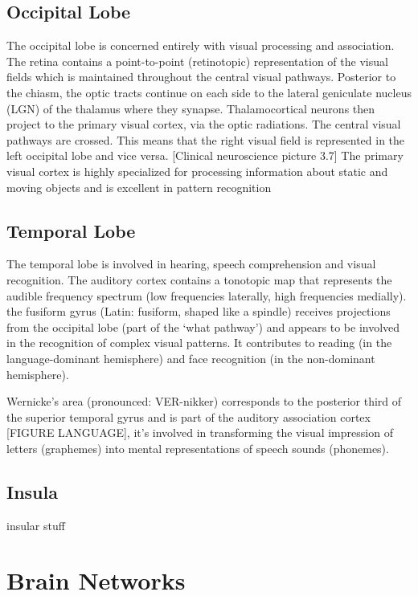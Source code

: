 \subsection{Occipital Lobe}
The occipital lobe is concerned entirely with visual processing and association.
The retina contains a point-to-point (retinotopic) representation of the visual fields which is maintained throughout the central visual pathways.
Posterior to the chiasm, the optic tracts continue on each side to the lateral geniculate nucleus (LGN) of the thalamus where they synapse.
Thalamocortical neurons then project to the primary visual cortex, via the optic radiations.
The central visual pathways are crossed. This means that the right visual field is represented in the left occipital lobe and vice versa.
[Clinical neuroscience picture 3.7]
The primary visual cortex is highly specialized for processing information about static and moving objects and is excellent in pattern recognition

\subsection{Temporal Lobe}
The temporal lobe is involved in hearing, speech comprehension and visual recognition.
The auditory cortex contains a tonotopic map that represents the audible frequency spectrum (low frequencies laterally, high frequencies medially).
the fusiform gyrus (Latin: fusiform, shaped like a spindle) receives projections from the occipital lobe (part of the ‘what pathway’) and appears to be involved in the recognition of complex visual patterns.
It contributes to reading (in the language-dominant hemisphere) and face recognition (in the non-dominant hemisphere).

Wernicke’s area (pronounced: VER-nikker) corresponds to the posterior third of the superior temporal gyrus and is part of the auditory association cortex [FIGURE LANGUAGE], it's involved in transforming the visual impression of letters (graphemes) into mental representations of speech sounds (phonemes).

\subsection{Insula}

insular stuff


\section{Brain Networks}

